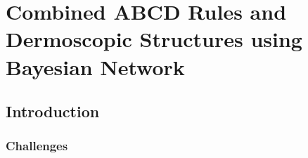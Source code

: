 \chapter{Combined ABCD Rules and Dermoscopic Structures using Bayesian Network}

\section{Introduction}

\subsection{Challenges}
